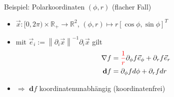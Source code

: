 \documentclass{beamer}
\newcommand{\R}{\mathds{R}}
\newcommand{\exd}{\mathbf{d}}
\newcommand{\tred}[1]{\textcolor{red}{#1}}
\begin{document}
  \begin{frame}
    \begin{block}{Beispiel: Polarkoordinaten \( \left( \phi,r \right) \) (flacher Fall)}
    \begin{itemize}
      \item \( \vec{x}:[0,2\pi)\times \R_{+} \rightarrow \R^{2} \), \( (\phi,r)\mapsto r\left[ \cos\phi, \sin\phi \right]^{T} \)
      \item mit \(  \vec{e}_{i} := \left\|\partial_{i}\vec{x} \right\|^{-1} \partial_{i}\vec{x} \) gilt
      \begin{align*}
        \nabla f &= \tred{\frac{1}{r}}\partial_{\phi} f \vec{e}_{\phi} + \partial_{r}f \vec{e}_{r} \\
        \exd f  &= \partial_{\phi}f d\phi + \partial_{r}f dr
      \end{align*}

      \item \( \Rightarrow \) \( \exd f \) koordinatenunabhängig (koordinatenfrei)
    \end{itemize}
    \end{block}
  \end{frame}
\end{document}
